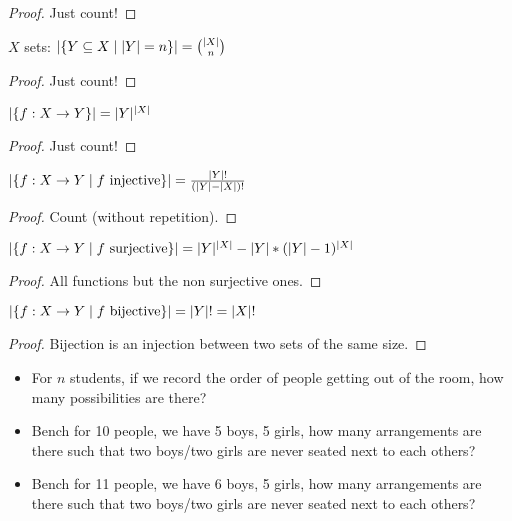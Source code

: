 \begin{proof}
Just count!
\end{proof}
\begin{property}
	$X$ sets: $|  \{ Y \subseteq X \mid | Y |=n \}  | = \binom{| X |}{n}$
\end{property}
\begin{proof}
	Just count!
\end{proof}
\begin{property}
	$|  \{f: X \to Y\}  | = | Y |^{| X |}$
\end{property}
\begin{proof}
	Just count!
\end{proof}
\begin{property}
	$|  \{f: X \to Y \mid f \text{ injective} \}  | = \frac{| Y |!}{(| Y |-| X |)!}$
\end{property}
\begin{proof}
	Count (without repetition).
\end{proof}
\begin{property}
	$|  \{f: X \to Y \mid f \text{ surjective} \}  | = | Y |^{| X |} - | Y |*(| Y |-1)^{| X |}$
\end{property}
\begin{proof}
	All functions but the non surjective ones.
\end{proof}
\begin{property}
	$|  \{f: X \to Y \mid f \text{ bijective} \}  | = | Y |! = | X |!$
\end{property}
\begin{proof}
	Bijection is an injection between two sets of the same size.
\end{proof}

\begin{question}
	\begin{itemize}
		\item For $n$ students, if we record the order of people getting out of the room, how many possibilities are there?
		\item Bench for 10 people, we have 5 boys, 5 girls, how many arrangements are there such that two boys/two girls are never seated next to each others?
		\item Bench for 11 people, we have 6 boys, 5 girls, how many arrangements are there such that two boys/two girls are never seated next to each others?
	\end{itemize}
\end{question}


